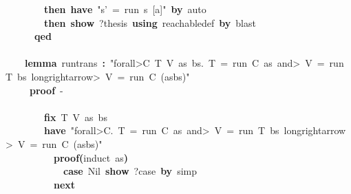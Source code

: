 \documentclass{article}
\newcommand{\syntaxKEYWORDA}[1]{\textcolor[rgb]{0.0,0.4,0.6}{\textbf{#1}}}
\newcommand{\syntaxKEYWORDC}[1]{\textcolor[rgb]{0.0,0.6,1.0}{\textbf{#1}}}
\newcommand{\syntaxLITERALA}[1]{\textcolor[rgb]{1.0,0.0,0.8}{#1}}
\newcommand{\syntaxOPERATOR}[1]{\textcolor[rgb]{0.0,0.0,0.0}{\textbf{#1}}}
\newcommand{\syntaxKEYWORDA}[1]{\textcolor[rgb]{0.0,0.4,0.6}{\textbf{#1}}}
\newcommand{\syntaxKEYWORDC}[1]{\textcolor[rgb]{0.0,0.6,1.0}{\textbf{#1}}}
\newcommand{\syntaxLITERALA}[1]{\textcolor[rgb]{1.0,0.0,0.8}{#1}}
\newcommand{\syntaxOPERATOR}[1]{\textcolor[rgb]{0.0,0.0,0.0}{\textbf{#1}}}
\newcommand{\syntaxKEYWORDA}[1]{\textcolor[rgb]{0.0,0.4,0.6}{\textbf{#1}}}
\newcommand{\syntaxKEYWORDC}[1]{\textcolor[rgb]{0.0,0.6,1.0}{\textbf{#1}}}
\newcommand{\syntaxLITERALA}[1]{\textcolor[rgb]{1.0,0.0,0.8}{#1}}
\newcommand{\syntaxOPERATOR}[1]{\textcolor[rgb]{0.0,0.0,0.0}{\textbf{#1}}}
\newcommand{\syntaxKEYWORDA}[1]{\textcolor[rgb]{0.0,0.4,0.6}{#1}}
\newcommand{\syntaxKEYWORDC}[1]{\textcolor[rgb]{0.0,0.6,1.0}{#1}}
\newcommand{\syntaxLITERALA}[1]{\textcolor[rgb]{1.0,0.0,0.8}{\textbf{#1}}}
\newcommand{\syntaxOPERATOR}[1]{\textcolor[rgb]{0.0,0.0,0.0}{#1}}
\newcommand{\syntaxKEYWORDA}[1]{\textcolor[rgb]{0.0,0.4,0.6}{\textbf{#1}}}
\newcommand{\syntaxKEYWORDC}[1]{\textcolor[rgb]{0.0,0.6,1.0}{\textbf{#1}}}
\newcommand{\syntaxLITERALA}[1]{\textcolor[rgb]{1.0,0.0,0.8}{#1}}
\newcommand{\syntaxOPERATOR}[1]{\textcolor[rgb]{0.0,0.0,0.0}{\textbf{#1}}}
\newcommand{\syntaxKEYWORDA}[1]{\textcolor[rgb]{0.0,0.4,0.6}{\textbf{#1}}}
\newcommand{\syntaxKEYWORDC}[1]{\textcolor[rgb]{0.0,0.6,1.0}{\textbf{#1}}}
\newcommand{\syntaxLITERALA}[1]{\textcolor[rgb]{1.0,0.0,0.8}{#1}}
\newcommand{\syntaxOPERATOR}[1]{\textcolor[rgb]{0.0,0.0,0.0}{\textbf{#1}}}
\begin{document}
{\ }{\ }{\ }{\ }{\ }{\ }{\ }{\ }\syntaxKEYWORDA{then}{\ }\syntaxKEYWORDA{have}{\ }\syntaxLITERALA{"s'{\ }={\ }run{\ }s{\ }{[}a{]}"}{\ }\syntaxKEYWORDA{by}{\ }auto{\ }{\ }{\ }{\ }{\ }{\ }{\ }{\ }{\ }{\ }\hspace*{\fill}\\
{\ }{\ }{\ }{\ }{\ }{\ }{\ }{\ }\syntaxKEYWORDA{then}{\ }\syntaxKEYWORDC{show}{\ }?thesis{\ }\syntaxKEYWORDA{using}{\ }reachable\usebox{\underscorebox}def{\ }\syntaxKEYWORDA{by}{\ }blast{\ }\hspace*{\fill}\\
{\ }{\ }{\ }{\ }{\ }{\ }\syntaxKEYWORDA{qed}\hspace*{\fill}\\
\hspace*{\fill}\\
{\ }{\ }{\ }{\ }\syntaxKEYWORDA{lemma}{\ }run\usebox{\underscorebox}trans{\ }\syntaxOPERATOR{:}{\ }\syntaxLITERALA{"\<forall>C{\ }T{\ }V{\ }as{\ }bs.{\ }T{\ }={\ }run{\ }C{\ }as{\ }\<and>{\ }V{\ }={\ }run{\ }T{\ }bs{\ }\<longrightarrow>{\ }V{\ }={\ }run{\ }C{\ }(as\usebox{\atbox}bs)"}\hspace*{\fill}\\
{\ }{\ }{\ }{\ }{\ }\syntaxKEYWORDA{proof}{\ }{-}\hspace*{\fill}\\
{\ }{\ }{\ }{\ }{\ }{\ }\syntaxKEYWORDA{\usebox{\opencurlybracket}}\hspace*{\fill}\\
{\ }{\ }{\ }{\ }{\ }{\ }{\ }{\ }\syntaxKEYWORDC{fix}{\ }T{\ }V{\ }as{\ }bs\hspace*{\fill}\\
{\ }{\ }{\ }{\ }{\ }{\ }{\ }{\ }\syntaxKEYWORDA{have}{\ }\syntaxLITERALA{"\<forall>C.{\ }T{\ }={\ }run{\ }C{\ }as{\ }\<and>{\ }V{\ }={\ }run{\ }T{\ }bs{\ }\<longrightarrow>{\ }V{\ }={\ }run{\ }C{\ }(as\usebox{\atbox}bs)"}\hspace*{\fill}\\
{\ }{\ }{\ }{\ }{\ }{\ }{\ }{\ }{\ }{\ }\syntaxKEYWORDA{proof}\syntaxOPERATOR{(}induct{\ }as\syntaxOPERATOR{)}\hspace*{\fill}\\
{\ }{\ }{\ }{\ }{\ }{\ }{\ }{\ }{\ }{\ }{\ }{\ }\syntaxKEYWORDC{case}{\ }Nil{\ }\syntaxKEYWORDC{show}{\ }?case{\ }\syntaxKEYWORDA{by}{\ }simp\hspace*{\fill}\\
{\ }{\ }{\ }{\ }{\ }{\ }{\ }{\ }{\ }{\ }\syntaxKEYWORDA{next}\hspace*{\fill}\\
\end{document}
